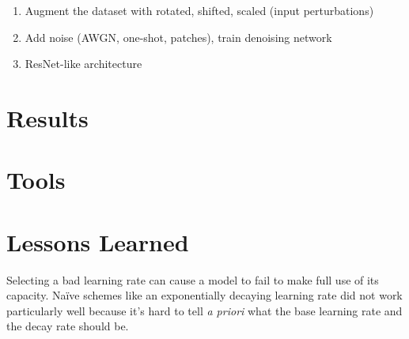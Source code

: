\documentclass[justified]{article}
\begin{document}
  \begin{enumerate}
  \item Augment the dataset with rotated, shifted, scaled (input perturbations)
  \item Add noise (AWGN, one-shot, patches), train denoising network
  \item ResNet-like architecture
  \end{enumerate}

  \section{Results}

  \section{Tools}

  \section{Lessons Learned}

  Selecting a bad learning rate can cause a model to fail to make full use of its capacity.
  Na\"{i}ve schemes like an exponentially decaying learning rate did not work particularly well because it's hard to tell \textit{a priori} what the base learning rate and the decay rate should be.
\end{document}
